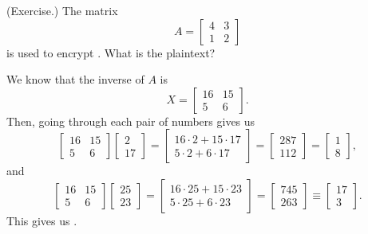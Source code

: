 \documentclass[letterpaper]{article}
\begin{document}
\begin{mdframed}
    (Exercise.) The matrix \[A = \begin{bmatrix}
        4 & 3 \\ 1 & 2
    \end{bmatrix}\] is used to encrypt . What is the plaintext? 

    \begin{mdframed}
        We know that the inverse of $A$ is \[X =  \begin{bmatrix}
            16 & 15 \\ 
            5 & 6 
        \end{bmatrix}.\] Then, going through each pair of numbers gives us 
        \[\begin{bmatrix}
            16 & 15 \\ 5 & 6
        \end{bmatrix} \begin{bmatrix}
            2 \\ 17
        \end{bmatrix} = \begin{bmatrix}
            16 \cdot 2 + 15 \cdot 17 \\ 
            5 \cdot 2 + 6 \cdot 17
        \end{bmatrix} = \begin{bmatrix}
            287 \\ 
            112
        \end{bmatrix} = \begin{bmatrix}
            1 \\ 
            8
        \end{bmatrix},\]
        and 
        \[\begin{bmatrix}
            16 & 15 \\ 5 & 6
        \end{bmatrix} \begin{bmatrix}
            25 \\ 23
        \end{bmatrix} = \begin{bmatrix}
            16 \cdot 25 + 15 \cdot 23 \\ 
            5 \cdot 25 + 6 \cdot 23 
        \end{bmatrix} = \begin{bmatrix}
            745 \\ 263
        \end{bmatrix} \equiv \begin{bmatrix}
            17 \\ 3
        \end{bmatrix}.\]
        This gives us .
    \end{mdframed}
\end{mdframed}
\end{document}

